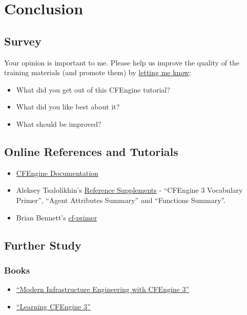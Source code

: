 



\chapter{Conclusion}





\section{Survey}

Your opinion is important to me. Please help us improve the quality of the training materials (and promote them) by \href{mailto:aleksey@verticalsysadmin.com}{letting me know}:

\begin{itemize}
\item{} What did you get out of this CFEngine tutorial?
\item{} What did you like best about it?
\item{} What should be improved?
\end{itemize}





\section{Online References and Tutorials}

\begin{itemize}
\item{} \href{http://docs.cfengine.com}{CFEngine Documentation}
\item{} Aleksey Tsalolikhin's \href{http://verticalsysadmin.com/cfengine}{Reference Supplements} - ``CFEngine 3 Vocabulary Primer'', ``Agent Attributes Summary'' and ``Functions Summary''.
\item{} Brian Bennett's \href{http://www.digitalelf.net/cf-primer}{cf-primer}
\end{itemize}





\section{Further Study}

\subsection{Books}

\begin{itemize}
\item{} \href{https://www.usenix.org/lisa/books/modern-infrastructure-engineering-cfengine-3}{``Modern Infrastructure Engineering with CFEngine 3''}
\item{} \href{http://shop.oreilly.com/product/0636920022022.do}{``Learning CFEngine 3''}
\end{itemize}